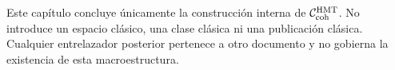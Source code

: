 \begin{warningbox}
Este capítulo concluye únicamente la construcción interna de
\(\mathcal C_{\rm coh}^{\rm HMT}\). No introduce un espacio clásico, una
clase clásica ni una publicación clásica. Cualquier entrelazador posterior
pertenece a otro documento y no gobierna la existencia de esta
macroestructura.
\end{warningbox}
\fi
